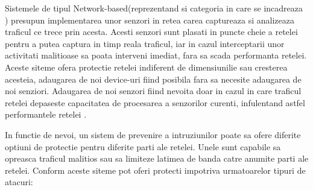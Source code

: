 Sistemele de tipul Network-based(reprezentand si categoria in care se incadreaza  \textit{\thesistitle}) presupun implementarea unor senzori in retea carea captureaza si analizeaza traficul ce trece prin acesta. Acesti senzori sunt plasati in puncte cheie a retelei pentru a putea captura in timp reala traficul, iar in cazul interceptarii unor activitati malitioase sa poata interveni imediat, fara sa scada performanta retelei. Aceste siteme ofera protectie retelei indiferent de dimensiunilie sau cresterea acesteia, adaugarea de noi device-uri fiind posibila fara sa necesite adaugarea de noi senziori. Adaugarea de noi senzori fiind nevoita doar in cazul in care traficul retelei depaseste capacitatea de procesarea a senzorilor curenti, infulentand astfel performantele retelei \cite{impl}.

In functie de nevoi, un sistem de prevenire a intruziunilor poate sa ofere diferite optiuni de protectie pentru diferite parti ale retelei. Unele sunt capabile sa opreasca traficul malitios sau sa limiteze latimea de banda catre anumite parti ale retelei. Conform \cite{ips_sec_types} aceste siteme pot oferi protecti impotriva urmatoarelor tipuri de atacuri:
